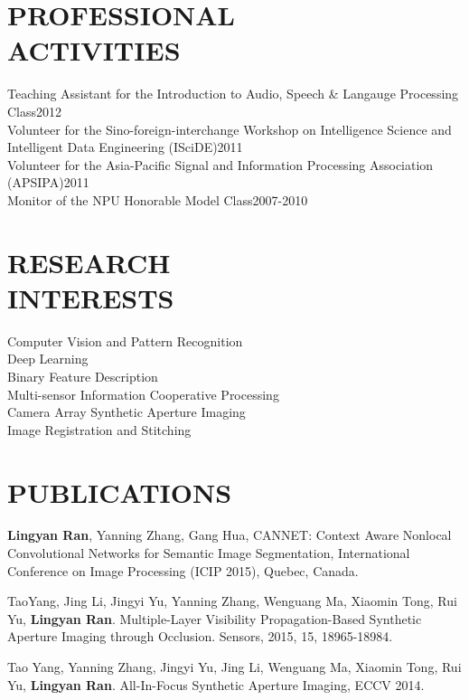 \documentclass[margin]{res}
\begin{document}
\begin{resume}
\section{PROFESSIONAL\\ACTIVITIES}
                Teaching Assistant for the Introduction to Audio, Speech \& Langauge Processing Class\hfill 2012\\
                Volunteer for the Sino-foreign-interchange Workshop on Intelligence Science and Intelligent Data Engineering (ISciDE)\hfill 2011\\
                Volunteer for the Asia-Pacific Signal and Information Processing Association (APSIPA)\hfill 2011\\
                Monitor of the NPU Honorable Model Class\hfill 2007-2010

\section{RESEARCH \\INTERESTS}
                Computer Vision and Pattern Recognition\\
                Deep Learning\\
                Binary Feature Description\\
                Multi-sensor Information Cooperative Processing\\
                Camera Array Synthetic Aperture Imaging\\
                Image Registration and Stitching

\section{PUBLICATIONS}
                \textbf{Lingyan Ran}, Yanning Zhang, Gang Hua, CANNET: Context Aware Nonlocal Convolutional Networks for Semantic Image Segmentation, International Conference on Image Processing (ICIP 2015), Quebec, Canada.
                
                TaoYang, Jing Li, Jingyi Yu, Yanning Zhang, Wenguang Ma, Xiaomin Tong, Rui Yu, \textbf{Lingyan Ran}. Multiple-Layer Visibility Propagation-Based Synthetic Aperture Imaging through Occlusion. Sensors, 2015, 15, 18965-18984.
    
                Tao Yang, Yanning Zhang, Jingyi Yu, Jing Li, Wenguang Ma, Xiaomin Tong, Rui Yu, \textbf{Lingyan Ran}. All-In-Focus Synthetic Aperture Imaging, ECCV 2014.


\end{resume}
\end{document}
